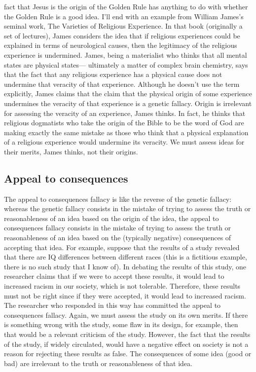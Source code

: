 fact that Jesus is the origin of the Golden Rule has anything to do with whether
the Golden Rule is a good idea.
I'll end with an example from William James's seminal work, The Varieties of
Religious Experience. In that book (originally a set of lectures), James considers
the idea that if religious experiences could be explained in terms of neurological
causes, then the legitimacy of the religious experience is undermined. James,
being a materialist who thinks that all mental states are physical states—
ultimately a matter of complex brain chemistry, says that the fact that any
religious experience has a physical cause does not undermine that veracity of
that experience. Although he doesn't use the term explicitly, James claims that
the claim that the physical origin of some experience undermines the veracity of
that experience is a genetic fallacy. Origin is irrelevant for assessing the veracity
of an experience, James thinks. In fact, he thinks that religious dogmatists who
take the origin of the Bible to be the word of God are making exactly the same
mistake as those who think that a physical explanation of a religious experience
would undermine its veracity. We must assess ideas for their merits, James
thinks, not their origins.

\subsection{Appeal to consequences}
The appeal to consequences fallacy is like the reverse of the genetic fallacy:
whereas the genetic fallacy consists in the mistake of trying to assess the truth or
reasonableness of an idea based on the origin of the idea, the appeal to
consequences fallacy consists in the mistake of trying to assess the truth or
reasonableness of an idea based on the (typically negative) consequences of
accepting that idea. For example, suppose that the results of a study revealed
that there are IQ differences between different races (this is a fictitious example,
there is no such study that I know of). In debating the results of this study, one
researcher claims that if we were to accept these results, it would lead to
increased racism in our society, which is not tolerable. Therefore, these results
must not be right since if they were accepted, it would lead to increased racism.
The researcher who responded in this way has committed the appeal to
consequences fallacy. Again, we must assess the study on its own merits. If
there is something wrong with the study, some flaw in its design, for example,
then that would be a relevant criticism of the study. However, the fact that the
results of the study, if widely circulated, would have a negative effect on society
is not a reason for rejecting these results as false. The consequences of some
idea (good or bad) are irrelevant to the truth or reasonableness of that idea.

